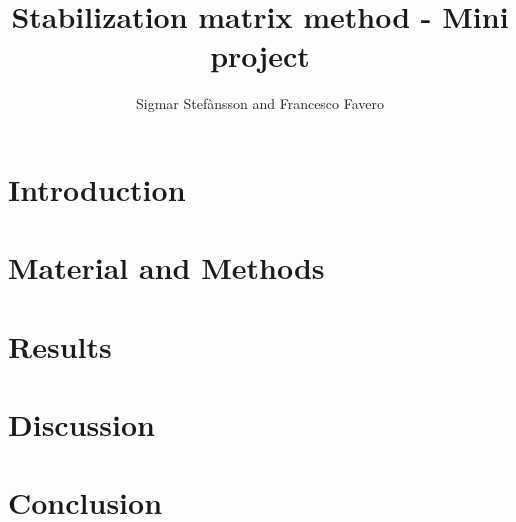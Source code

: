 \documentclass{bioinfo}
\begin{document}
\begin{application}

\title[SMM Project]{Stabilization matrix method - Mini project}
\author[Sigmar Stef\`{a}nsson, Francesco Favero]{Sigmar Stef\`{a}nsson and Francesco Favero}

\address{Danmarks Tekniske Univeristet}



\maketitle

\begin{abstract}

   


\end{abstract}

\section*{Introduction}
   


\section*{Material and Methods}
   


\section*{Results}
   



\section*{Discussion}
   

\section*{Conclusion}
   
\newpage





%
%
%
%
%






\end{application}
\end{document}
